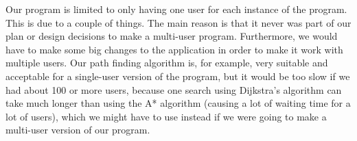 Our program is limited to only having one user for each instance of the program. This is due to a couple of things. The main reason is that it never was part of our plan or design decisions to make a multi-user program. Furthermore, we would have to make some big changes to the application in order to make it work with multiple users. Our path finding algorithm is, for example, very suitable and acceptable for a single-user version of the program, but it would be too slow if we had about 100 or more users, because one search using Dijkstra's algorithm can take much longer than using the A* algorithm (causing a lot of waiting time for a lot of users), which we might have to use instead if we were going to make a multi-user version of our program.
